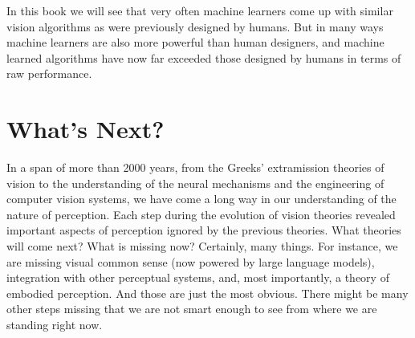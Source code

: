 

In this book we will see that very often machine learners come up with similar vision algorithms as were previously designed by humans. But in many ways machine learners are also more powerful than human designers, and machine learned algorithms have now far exceeded those designed by humans in terms of raw performance.
















\section{What's Next?}


In a span of more than 2000 years, from the Greeks' extramission theories of vision to the understanding of the neural mechanisms and the engineering of computer vision systems, we have come a long way in our understanding of the nature of perception.
Each step during the evolution of vision theories revealed important aspects of perception ignored by the previous theories. What theories will come next? What is missing now? Certainly, many things. For instance, we are missing visual common sense (now powered by large language models), integration with other perceptual systems, and, most importantly, a theory of embodied perception. And those are just the most obvious. There might be many other steps missing that we are not smart enough to see from where we are standing right now.



